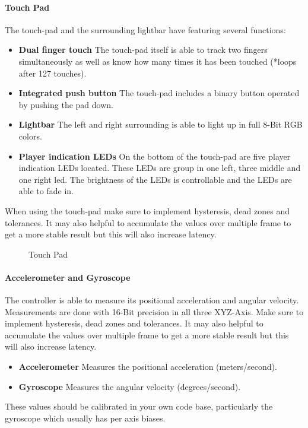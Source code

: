\paragraph{Touch Pad}
The touch-pad and the surrounding lightbar have featuring several functions:
\begin{itemize}
	\item \textbf{Dual finger touch} The touch-pad itself is able to track two fingers simultaneously as well as know how many times it has been touched (*loops after 127 touches).
	\item \textbf{Integrated push button} The touch-pad includes a binary button operated by pushing the pad down.
	\item \textbf{Lightbar} The left and right surrounding is able to light up in full 8-Bit RGB colors. 
	\item \textbf{Player indication LEDs} On the bottom of the touch-pad are five player indication LEDs located. These LEDs are group in one left, three middle and one right led. The brightness of the LEDs is controllable and the LEDs are able to fade in.
\end{itemize}
When using the touch-pad make sure to implement hysteresis, dead zones and tolerances. It may also helpful to accumulate the values over multiple frame to get a more stable result but this will also increase latency. 
\begin{figure}[H]
    \centering
    \caption{Touch Pad}
\end{figure}

\paragraph{Accelerometer and Gyroscope}
The controller is able to measure its positional acceleration and angular velocity. Measurements are done with 16-Bit precision in all three XYZ-Axis. Make sure to implement hysteresis, dead zones and tolerances. It may also helpful to accumulate the values over multiple frame to get a more stable result but this will also increase latency.
\begin{itemize}
	\item \textbf{Accelerometer} Measures the positional acceleration (meters/second).
	\item \textbf{Gyroscope} Measures the angular velocity (degrees/second). 
\end{itemize}
These values should be calibrated in your own code base, particularly the gyroscope which usually has per axis biases.

